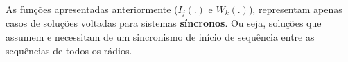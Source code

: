 







As funções apresentadas anteriormente ($I_{j}(.)$ e $W_{k}(.)$), representam apenas casos de soluções voltadas para sistemas {\bf síncronos}. Ou seja, soluções que assumem e necessitam de um sincronismo de início de sequência entre as sequências de todos os rádios. 

